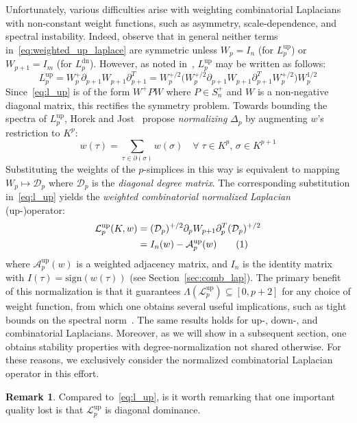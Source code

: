 \documentclass[10pt]{article}
\numberwithin{equation}{section}
\newcommand{\+}{%
	\raisebox{0.18ex}{\scaleobj{0.55}{+}}
}
\theoremstyle{definition}
\newtheorem{remark}{Remark}
\theoremstyle{definition}
\newcommand\numberthis{\addtocounter{equation}{1}\tag{\theequation}}
\begin{document}
Unfortunately, various difficulties arise with weighting combinatorial Laplacians with non-constant weight functions, such as asymmetry, scale-dependence, and spectral instability.
Indeed, observe that in general neither terms in~\eqref{eq:weighted_up_laplace} are symmetric unless $W_p = I_n$ (for $L_p^{\text{up}}$) or $W_{p+1} = I_m$ (for $L_p^{\text{dn}}$). 
However, as noted in~\cite{memoli2022persistent}, $L_p^{\text{up}}$ may be written as follows: 
\begin{equation}\label{eq:l_up}
	L_p^{\text{up}} = W_p^{+} \partial_{p+1} W_{p+1} \partial_{p+1}^T  = W_p^{+/2} \big( W_p^{+/2}  \partial_{p+1} W_{p+1} \partial_{p+1}^T W_p^{+/2}  \big ) W_p^{1/2} 
\end{equation}
Since~\eqref{eq:l_up} is of the form $W^{+} P W$ where $P \in S_n^+$ and $W$ is a non-negative diagonal matrix, this rectifies the symmetry problem.
Towards bounding the spectra of $L_p^{\text{up}}$, Horek and Jost~\cite{} propose \emph{normalizing} $\Delta_p$ by augmenting $w$'s restriction to $K^p$: 
\begin{equation}
	w(\tau) = \sum\limits_{\tau \in \partial(\sigma) }w(\sigma) \quad \forall \; \tau \in K^{p}, \, \sigma \in K^{p+1}
\end{equation}
Substituting the weights of the $p$-simplices in this way is equivalent to mapping $W_p \mapsto \mathcal{D}_p$ where $\mathcal{D}_p$ is the \emph{diagonal degree matrix}. The corresponding substitution in~\eqref{eq:l_up} yields the \emph{weighted combinatorial normalized Laplacian} (up-)operator:
\begin{align*}\label{eq:normalized_up_lap}
	 \mathcal{L}_p^{\text{up}}(K, w) &= (\mathcal{D}_p)^{+/2} \partial_p W_{p+1} \partial_p^T (\mathcal{D}_p)^{+/2} \\
	 &= I_n(w) - \mathcal{A}_p^{\text{up}}(w) \numberthis
\end{align*}
where $\mathcal{A}_p^{\text{up}}(w)$ is a weighted adjacency matrix, and $I_n$ is the identity matrix with $I(\tau) = \mathrm{sign}(w(\tau))$ (see Section~\ref{sec:comb_lap}). The primary benefit of this normalization is that it guarantees $\Lambda( \mathcal{L}_p^{\text{up}}) \subseteq [0,p+2]$ for any choice of weight function, from which one obtains several useful implications, such as tight bounds on the spectral norm~\cite{}. 
The same results holds for up-, down-, and combinatorial Laplacians.
Moreover, as we will show in a subsequent section, one obtains stability properties with degree-normalization not shared otherwise. For these reasons, we exclusively consider the normalized combinatorial Laplacian operator in this effort.  
\begin{remark}
	Compared to~\eqref{eq:l_up}, is it worth remarking that one important quality lost is that $\mathcal{L}_p^{\text{up}}$ is diagonal dominance. %
\end{remark}
\end{document}
